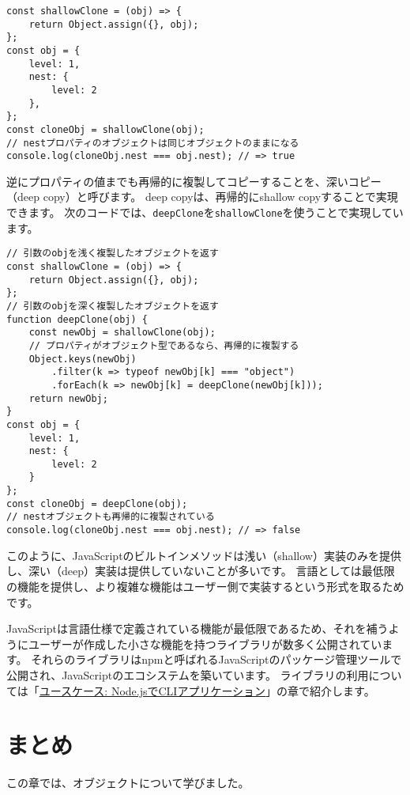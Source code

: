 \begin{lstlisting}
const shallowClone = (obj) => {
    return Object.assign({}, obj);
};
const obj = {
    level: 1,
    nest: {
        level: 2
    },
};
const cloneObj = shallowClone(obj);
// nestプロパティのオブジェクトは同じオブジェクトのままになる
console.log(cloneObj.nest === obj.nest); // => true
\end{lstlisting}

逆にプロパティの値までも再帰的に複製してコピーすることを、深いコピー（deep
copy）と呼びます。 deep copyは、再帰的にshallow
copyすることで実現できます。
次のコードでは、\texttt{deepClone}を\texttt{shallowClone}を使うことで実現しています。

\begin{lstlisting}
// 引数のobjを浅く複製したオブジェクトを返す
const shallowClone = (obj) => {
    return Object.assign({}, obj);
};
// 引数のobjを深く複製したオブジェクトを返す
function deepClone(obj) {
    const newObj = shallowClone(obj);
    // プロパティがオブジェクト型であるなら、再帰的に複製する
    Object.keys(newObj)
        .filter(k => typeof newObj[k] === "object")
        .forEach(k => newObj[k] = deepClone(newObj[k]));
    return newObj;
}
const obj = {
    level: 1,
    nest: {
        level: 2
    }
};
const cloneObj = deepClone(obj);
// nestオブジェクトも再帰的に複製されている
console.log(cloneObj.nest === obj.nest); // => false
\end{lstlisting}

このように、JavaScriptのビルトインメソッドは浅い（shallow）実装のみを提供し、深い（deep）実装は提供していないことが多いです。
言語としては最低限の機能を提供し、より複雑な機能はユーザー側で実装するという形式を取るためです。

JavaScriptは言語仕様で定義されている機能が最低限であるため、それを補うようにユーザーが作成した小さな機能を持つライブラリが数多く公開されています。
それらのライブラリはnpmと呼ばれるJavaScriptのパッケージ管理ツールで公開され、JavaScriptのエコシステムを築いています。
ライブラリの利用については「\hyperlink{node-cli}{ユースケース:
Node.jsでCLIアプリケーション}」の章で紹介します。

\hypertarget{conclusion}{%
\section{まとめ}\label{conclusion}}

この章では、オブジェクトについて学びました。

